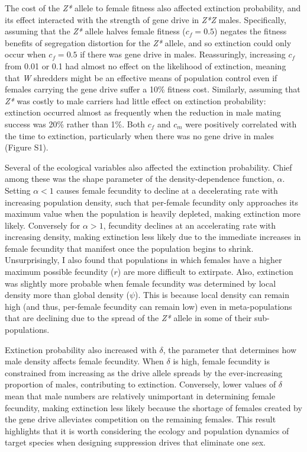 \documentclass[]{rsos}%
\begin{document}
The cost of the \emph{Z*} allele to female fitness also affected
extinction probability, and its effect interacted with the strength of
gene drive in \emph{Z*Z} males. Specifically, assuming that the
\emph{Z*} allele halves female fitness (\(c_f = 0.5\)) negates the
fitness benefits of segregation distortion for the \emph{Z*} allele, and
so extinction could only occur when \(c_f = 0.5\) if there was gene
drive in males. Reassuringly, increasing \(c_f\) from 0.01 or 0.1 had
almost no effect on the likelihood of extinction, meaning that \emph{W}
shredders might be an effective means of population control even if
females carrying the gene drive suffer a 10\% fitness cost. Similarly,
assuming that \emph{Z*} was costly to male carriers had little effect on
extinction probability: extinction occurred almost as frequently when
the reduction in male mating success was 20\% rather than 1\%. Both
\(c_f\) and \(c_m\) were positively correlated with the time to
extinction, particularly when there was no gene drive in males (Figure
S1).

Several of the ecological variables also affected the extinction
probability. Chief among these was the shape parameter of the
density-dependence function, \(\alpha\). Setting \(\alpha < 1\) causes
female fecundity to decline at a decelerating rate with increasing
population density, such that per-female fecundity only approaches its
maximum value when the population is heavily depleted, making extinction
more likely. Conversely for \(\alpha > 1\), fecundity declines at an
accelerating rate with increasing density, making extinction less likely
due to the immediate increases in female fecundity that manifest once
the population begins to shrink. Unsurprisingly, I also found that
populations in which females have a higher maximum possible fecundity
(\(r\)) are more difficult to extirpate. Also, extinction was slightly
more probable when female fecundity was determined by local density more
than global density (\(\psi\)). This is because local density can remain
high (and thus, per-female fecundity can remain low) even in
meta-populations that are declining due to the spread of the \emph{Z*}
allele in some of their sub-populations.

Extinction probability also increased with \(\delta\), the parameter
that determines how male density affects female fecundity. When
\(\delta\) is high, female fecundity is constrained from increasing as
the drive allele spreads by the ever-increasing proportion of males,
contributing to extinction. Conversely, lower values of \(\delta\) mean
that male numbers are relatively unimportant in determining female
fecundity, making extinction less likely because the shortage of females
created by the gene drive alleviates competition on the remaining
females. This result highlights that it is worth considering the ecology
and population dynamics of target species when designing suppression
drives that eliminate one sex.
\end{document}
